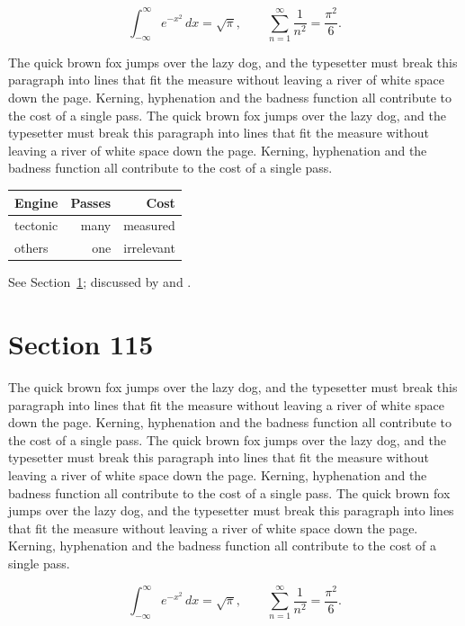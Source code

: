 \documentclass{article}
\begin{document}
\begin{equation}\label{eq:114}
\int_{-\infty}^{\infty} e^{-x^{2}}\,dx = \sqrt{\pi}, \qquad
\sum_{n=1}^{\infty} \frac{1}{n^{2}} = \frac{\pi^{2}}{6}.
\end{equation}

The quick brown fox jumps over the lazy dog, and the typesetter must break this paragraph into lines that fit the measure without leaving a river of white space down the page. Kerning, hyphenation and the badness function all contribute to the cost of a single pass. The quick brown fox jumps over the lazy dog, and the typesetter must break this paragraph into lines that fit the measure without leaving a river of white space down the page. Kerning, hyphenation and the badness function all contribute to the cost of a single pass. 

\begin{center}
\begin{tabular}{lrr}
\toprule
Engine & Passes & Cost \\
\midrule
tectonic & many & measured \\
others & one & irrelevant \\
\bottomrule
\end{tabular}
\end{center}

See Section~\ref{sec:115}; discussed by \textcite{k5} and \textcite{l2}.
\section{Section 115}
\label{sec:115}
The quick brown fox jumps over the lazy dog, and the typesetter must break this paragraph into lines that fit the measure without leaving a river of white space down the page. Kerning, hyphenation and the badness function all contribute to the cost of a single pass. The quick brown fox jumps over the lazy dog, and the typesetter must break this paragraph into lines that fit the measure without leaving a river of white space down the page. Kerning, hyphenation and the badness function all contribute to the cost of a single pass. The quick brown fox jumps over the lazy dog, and the typesetter must break this paragraph into lines that fit the measure without leaving a river of white space down the page. Kerning, hyphenation and the badness function all contribute to the cost of a single pass. 

\begin{equation}\label{eq:115}
\int_{-\infty}^{\infty} e^{-x^{2}}\,dx = \sqrt{\pi}, \qquad
\sum_{n=1}^{\infty} \frac{1}{n^{2}} = \frac{\pi^{2}}{6}.
\end{equation}
\end{document}

